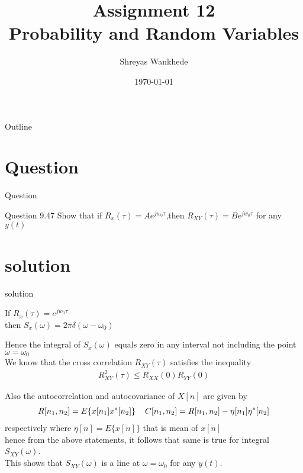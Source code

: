 \documentclass{beamer}
\title{Assignment 12\\Probability and Random Variables}
\author{Shreyas Wankhede}
\date{\today}
\institute{IIT Hyderabad}
\begin{document}
\begin{frame}
    \titlepage 
\end{frame}

\logo{}


\begin{frame}{Outline}
    \tableofcontents
\end{frame}


\section{Question}
\begin{frame}{Question}
\begin{block}{Question 9.47}
Show that if $R_x(\tau)=Ae^{jw_0\tau}$,then $R_{XY}(\tau)=Be^{jw_0\tau} $ for any $y(t)$
\end{block}


\end{frame}


\section{solution}
\begin{frame}{solution}
\begin{block}{}
If $R_x(\tau)=e^{jw_0\tau}$\\
then $S_x(\omega)=2\pi\delta(\omega-\omega_0)$
\end{block}
Hence the integral of $S_x(\omega)$ equals zero in any interval not including the point $\omega=\omega_0$\\
We know that the cross correlation $R_{XY}(\tau)$ satisfies the inequality
\begin{align}
R_{XY}^2(\tau)\le R_{XX}(0)R_{YY}(0)\nonumber
\end{align}
\end{frame}

\begin{frame}{}
Also the autocorrelation and autocovariance of $X[n]$ are given by
\begin{align}
R[n_1,n_2]=E\{x[n_1]x^*[n_2]\}\hspace{4mm} C[n_1,n_2]=R[n_1,n_2]-\eta[n_1]\eta^*[n_2]\nonumber
\end{align}
respectively where $\eta[n]=E\{x[n]\}$ that is mean of $x[n]$\\\vspace{5mm}
hence from the above statements, it follows that same is true for integral $S_{XY}(\omega)$.\\\vspace{5mm}
This shows that $S_{XY}(\omega)$ is a line at $\omega=\omega_0$ for any $y(t)$.

\end{frame}
\end{document}
